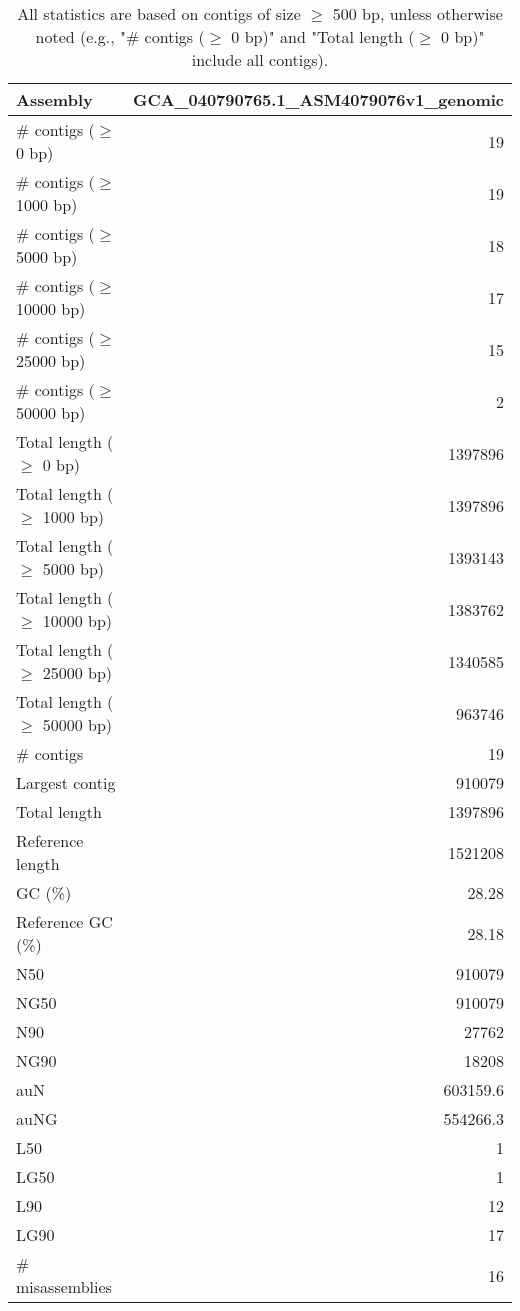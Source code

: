 \documentclass[12pt,a4paper]{article}
\begin{document}
\begin{table}[ht]
\begin{center}
\caption{All statistics are based on contigs of size $\geq$ 500 bp, unless otherwise noted (e.g., "\# contigs ($\geq$ 0 bp)" and "Total length ($\geq$ 0 bp)" include all contigs).}
\begin{tabular}{|l*{1}{|r}|}
\hline
Assembly & GCA\_040790765.1\_ASM4079076v1\_genomic \\ \hline
\# contigs ($\geq$ 0 bp) & 19 \\ \hline
\# contigs ($\geq$ 1000 bp) & 19 \\ \hline
\# contigs ($\geq$ 5000 bp) & 18 \\ \hline
\# contigs ($\geq$ 10000 bp) & 17 \\ \hline
\# contigs ($\geq$ 25000 bp) & 15 \\ \hline
\# contigs ($\geq$ 50000 bp) & 2 \\ \hline
Total length ($\geq$ 0 bp) & 1397896 \\ \hline
Total length ($\geq$ 1000 bp) & 1397896 \\ \hline
Total length ($\geq$ 5000 bp) & 1393143 \\ \hline
Total length ($\geq$ 10000 bp) & 1383762 \\ \hline
Total length ($\geq$ 25000 bp) & 1340585 \\ \hline
Total length ($\geq$ 50000 bp) & 963746 \\ \hline
\# contigs & 19 \\ \hline
Largest contig & 910079 \\ \hline
Total length & 1397896 \\ \hline
Reference length & 1521208 \\ \hline
GC (\%) & 28.28 \\ \hline
Reference GC (\%) & 28.18 \\ \hline
N50 & 910079 \\ \hline
NG50 & 910079 \\ \hline
N90 & 27762 \\ \hline
NG90 & 18208 \\ \hline
auN & 603159.6 \\ \hline
auNG & 554266.3 \\ \hline
L50 & 1 \\ \hline
LG50 & 1 \\ \hline
L90 & 12 \\ \hline
LG90 & 17 \\ \hline
\# misassemblies & 16 \\ \hline

\end{tabular}
\end{center}
\end{table}
\end{document}
